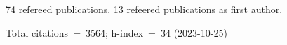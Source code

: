 74 refereed publications. 13 refeered publications as first author.

Total citations~=~3564; h-index~=~34 (2023-10-25)